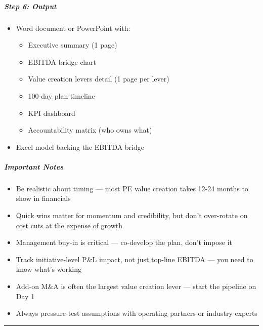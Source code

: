 \documentclass[11pt]{article}
\begin{document}
\subparagraph{Step 6: Output}\mbox{}\par

\begin{itemize}[leftmargin=*,itemsep=2pt,topsep=2pt]
\item {} Word document or PowerPoint with:
\begin{itemize}[leftmargin=*,itemsep=2pt,topsep=2pt]
\item {} Executive summary (1 page)
\item {} EBITDA bridge chart
\item {} Value creation levers detail (1 page per lever)
\item {} 100-day plan timeline
\item {} KPI dashboard
\item {} Accountability matrix (who owns what)
\end{itemize}
\item {} Excel model backing the EBITDA bridge
\end{itemize}

\subparagraph{Important Notes}\mbox{}\par

\begin{itemize}[leftmargin=*,itemsep=2pt,topsep=2pt]
\item {} Be realistic about timing — most PE value creation takes 12-24 months to show in financials
\item {} Quick wins matter for momentum and credibility, but don't over-rotate on cost cuts at the expense of growth
\item {} Management buy-in is critical — co-develop the plan, don't impose it
\item {} Track initiative-level P\&L impact, not just top-line EBITDA — you need to know what's working
\item {} Add-on M\&A is often the largest value creation lever — start the pipeline on Day 1
\item {} Always pressure-test assumptions with operating partners or industry experts
\end{itemize}

\vspace{0.8em}\hrule\vspace{0.8em}
\end{document}
